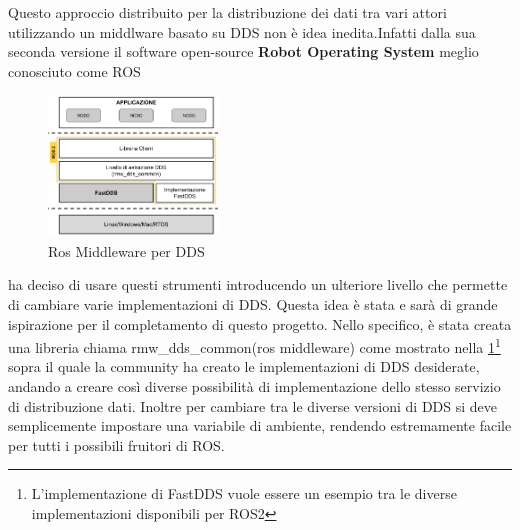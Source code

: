 Questo approccio distribuito per la distribuzione dei dati tra vari attori utilizzando un middlware basato su DDS non è idea inedita.Infatti dalla sua seconda versione il software open-source \textbf{Robot Operating System} meglio conosciuto come ROS
\begin{figure}
  \includegraphics[width=0.4\textwidth]{img/ROS_MW.png}
  \caption{Ros Middleware per DDS} 
  \label{fig:rmw_dds_common}
\end{figure}
ha deciso di usare questi strumenti introducendo un ulteriore livello che permette di cambiare varie implementazioni di DDS. Questa idea è stata e sarà di grande ispirazione per il completamento di questo progetto.
Nello specifico, è stata creata una libreria chiama rmw\_dds\_common(ros middleware) come mostrato nella \ref{fig:rmw_dds_common}\footnote{L'implementazione di FastDDS vuole essere un esempio tra le diverse implementazioni disponibili per ROS2} sopra il quale la community ha creato le implementazioni di DDS desiderate, andando a creare così diverse possibilità di implementazione dello stesso servizio di distribuzione dati.
Inoltre per cambiare tra le diverse versioni di DDS si deve semplicemente impostare una variabile di ambiente, rendendo estremamente facile per tutti i possibili fruitori di ROS. 




